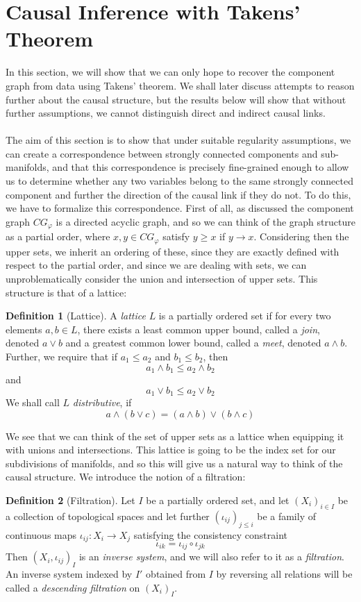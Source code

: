 \documentclass[11pt, a4paper]{memoir}
\theoremstyle{plain}
\theoremstyle{definition}
\newtheorem{defn}{Definition}
\begin{document}
\section{Causal Inference with Takens' Theorem}
In this section, we will show that we can only hope to recover the component graph from data using Takens' theorem. We shall later discuss attempts to reason further about the causal structure, but the results below will show that without further assumptions, we cannot distinguish direct and indirect causal links.\\\\
The aim of this section is to show that under suitable regularity assumptions, we can create a correspondence between strongly connected components and sub-manifolds, and that this correspondence is precisely fine-grained enough to allow us to determine whether any two variables belong to the same strongly connected component and further the direction of the causal link if they do not. To do this, we have to formalize this correspondence. First of all, as discussed the component graph $CG_\varphi$ is a directed acyclic graph, and so we can think of the graph structure as a partial order, where $x,y\in CG_\varphi$ satisfy $y\geq x$ if $y\to x$. Considering then the upper sets, we inherit an ordering of these, since they are exactly defined with respect to the partial order, and since we are dealing with sets, we can unproblematically consider the union and intersection of upper sets. This structure is that of a lattice: 
\begin{defn}[Lattice]
A \emph{lattice} $L$ is a partially ordered set if for every two elements $a,b\in L$, there exists a least common upper bound, called a \emph{join}, denoted $a \vee b$ and a greatest common lower bound, called a \emph{meet}, denoted $a\wedge b$. Further, we require that if $a_1\leq a_2$ and $b_1\leq b_2$, then
$$a_1\wedge b_1\leq a_2\wedge b_2$$
and
$$a_1\vee b_1\leq a_2\vee b_2$$
We shall call $L$ \emph{distributive}, if
$$a\wedge(b\vee c)=(a\wedge b)\vee (b\wedge c)$$
\end{defn}
We see that we can think of the set of upper sets as a lattice when equipping it with unions and intersections. This lattice is going to be the index set for our subdivisions of manifolds, and so this will give us a natural way to think of the causal structure. We introduce the notion of a filtration:
\begin{defn}[Filtration]
Let $I$ be a partially ordered set, and let $(X_i)_{i\in I}$ be a collection of topological spaces and let further $(\iota_{ij})_{j\leq i}$ be a family of continuous maps $\iota_{ij}: X_i\to X_j$ satisfying the consistency constraint
$$\iota_{ik}=\iota_{ij}\circ \iota_{jk}$$
Then $(X_i,\iota_{ij})_I$ is an \emph{inverse system}, and we will also refer to it as a \emph{filtration}. An inverse system indexed by $I'$ obtained from $I$ by reversing all relations will be called a \emph{descending filtration} on $(X_i)_I$.
\end{defn}
\end{document}
